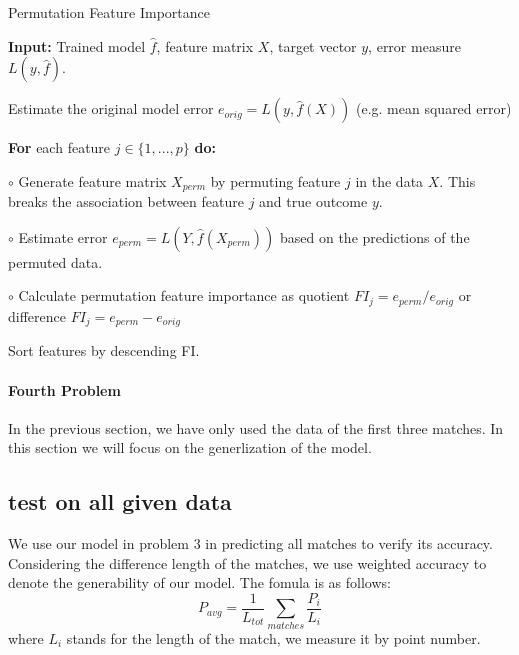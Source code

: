 \documentclass[12pt, a4paper, oneside]{article}
\theoremstyle{break}
\begin{document}
\begin{algorithm}  
    \caption{Permutation Feature Importance}  
    \textbf{Input:} Trained model $\hat{f}$, feature matrix $X$, target vector $y$, error measure $L(y, \hat{f})$.  
      
    Estimate the original model error $e_{orig} = L(y, \hat{f}(X))$ (e.g. mean squared error)  
      
    \textbf{For} each feature $j \in \{1, ..., p\}$ \textbf{do:}  
      
    \quad\quad $\circ$ Generate feature matrix $X_{perm}$ by permuting feature $j$ in the data $X$. This breaks the association between feature $j$ and true outcome $y$.  
      
    \quad\quad $\circ$ Estimate error $e_{perm} = L(Y, \hat{f}(X_{perm}))$ based on the predictions of the permuted data.  
      
    \quad\quad $\circ$ Calculate permutation feature importance as quotient $FI_j = e_{perm} / e_{orig}$ or difference $FI_j = e_{perm} - e_{orig}$  
      
    Sort features by descending FI.
\end{algorithm}  

\paragraph{Fourth Problem}
In the previous section, we have only used the data of the first three matches. In this section we will focus on the generlization of the model.

\subsection{test on all given data}

We use our model in problem 3 in predicting all matches to verify its accuracy. Considering the difference length of the matches, we use weighted
accuracy to denote the generability of our model. The fomula is as follows:
$$ P_{avg}=\frac{1}{L_{tot}}\sum\limits_{matches}\frac{P_i}{L_i}$$
where $L_i$ stands for the length of the match, we measure it by point number.
\end{document}
